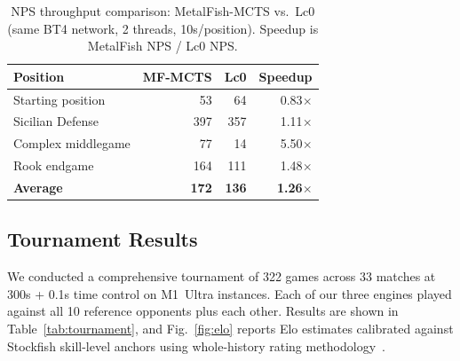 \documentclass{svproc}
\begin{document}
\begin{table}[!htbp]
\centering
\caption{NPS throughput comparison: MetalFish-MCTS vs.\ Lc0 (same BT4 network, 2 threads, 10s/position). Speedup is MetalFish NPS / Lc0 NPS.}
\label{tab:nps}
\begin{tabular}{lrrr}
\toprule
\textbf{Position} & \textbf{MF-MCTS} & \textbf{Lc0} & \textbf{Speedup} \\
\midrule
Starting position  & 53   & 64  & 0.83$\times$ \\
Sicilian Defense   & 397  & 357 & 1.11$\times$ \\
Complex middlegame & 77   & 14  & 5.50$\times$ \\
Rook endgame       & 164  & 111 & 1.48$\times$ \\
\midrule
\textbf{Average}   & \textbf{172} & \textbf{136} & \textbf{1.26$\times$} \\
\bottomrule
\end{tabular}
\end{table}

\FloatBarrier
\subsection{Tournament Results}
\label{sec:eval-tournament}

We conducted a comprehensive tournament of 322 games across 33 matches at 300s + 0.1s time control on M1~Ultra instances. Each of our three engines played against all 10 reference opponents plus each other. Results are shown in Table~\ref{tab:tournament}, and Fig.~\ref{fig:elo} reports Elo estimates calibrated against Stockfish skill-level anchors using whole-history rating methodology~\cite{coulom2008elo}.
\end{document}

